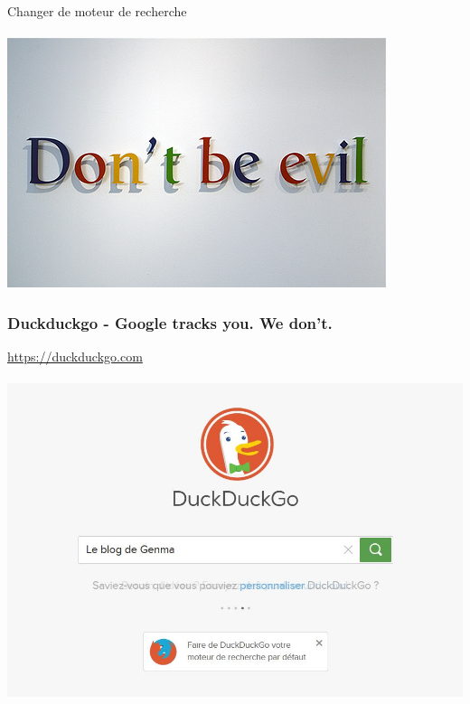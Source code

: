\documentclass{beamer}
\begin{document}
\begin{frame}
\begin{center}
\Huge{Changer de moteur de recherche}
\\~\\
\includegraphics[scale=2] {./images/dontbeevil.jpg}
\end{center}
\end{frame}
\begin{frame}
\begin{center}
\frametitle{Duckduckgo - Google tracks you. We don't.}

\url{https://duckduckgo.com}
\\~\\
\includegraphics[scale=0.6] {./images/DuckDuckGo.jpg}
\end{center}
\end{frame}
\end{document}
